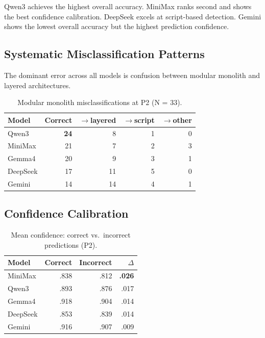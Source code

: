 \documentclass[runningheads]{llncs}
\begin{document}
Qwen3 achieves the highest overall accuracy. MiniMax ranks second and shows the best confidence calibration. DeepSeek excels at script-based detection. Gemini shows the lowest overall accuracy but the highest prediction confidence.

\subsection{Systematic Misclassification Patterns}

The dominant error across all models is confusion between modular monolith and layered architectures.

\begin{table}[htbp]
\caption{Modular monolith misclassifications at P2 (N = 33).}
\label{tab:mm_errors}
\centering
\small
\begin{tabular}{lrrrr}
\toprule
\textbf{Model} & \textbf{Correct} & $\rightarrow$\textbf{layered} & $\rightarrow$\textbf{script} & $\rightarrow$\textbf{other} \\
\midrule
Qwen3    & \textbf{24} & 8 & 1 & 0 \\
MiniMax  & 21 & 7 & 2 & 3 \\
Gemma4   & 20 & 9 & 3 & 1 \\
DeepSeek & 17 & 11 & 5 & 0 \\
Gemini   & 14 & 14 & 4 & 1 \\
\bottomrule
\end{tabular}
\end{table}

\subsection{Confidence Calibration}

\begin{table}[htbp]
\caption{Mean confidence: correct vs.\ incorrect predictions (P2).}
\label{tab:confidence}
\centering
\small
\begin{tabular}{lrrr}
\toprule
\textbf{Model} & \textbf{Correct} & \textbf{Incorrect} & \textbf{$\Delta$} \\
\midrule
MiniMax  & .838 & .812 & \textbf{.026} \\
Qwen3    & .893 & .876 & .017 \\
Gemma4   & .918 & .904 & .014 \\
DeepSeek & .853 & .839 & .014 \\
Gemini   & .916 & .907 & .009 \\
\bottomrule
\end{tabular}
\end{table}
\end{document}
